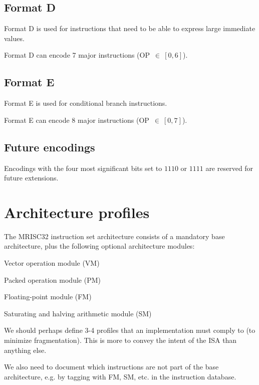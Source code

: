 \subsection{Format D}

Format D is used for instructions that need to be able to express large
immediate values.

Format D can encode 7 major instructions (OP~$\in~[0,6]$).

\subsection{Format E}

Format E is used for conditional branch instructions.

Format E can encode 8 major instructions (OP~$\in~[0,7]$).

\subsection{Future encodings}

Encodings with the four most significant bits set to $1110$ or $1111$ are
reserved for future extensions.

\section{Architecture profiles}

The MRISC32 instruction set architecture consists of a mandatory base
architecture, plus the following optional architecture modules:

\begin{bulletitems}
  \item Vector operation module (VM)
  \item Packed operation module (PM)
  \item Floating-point module (FM)
  \item Saturating and halving arithmetic module (SM)
\end{bulletitems}

\begin{todobox}
  We should perhaps define 3-4 profiles that an implementation must comply to
  (to minimize fragmentation). This is more to convey the intent of the ISA
  than anything else.

  We also need to document which instructions are not part of the base
  architecture, e.g. by tagging with FM, SM, etc. in the instruction database.
\end{todobox}
